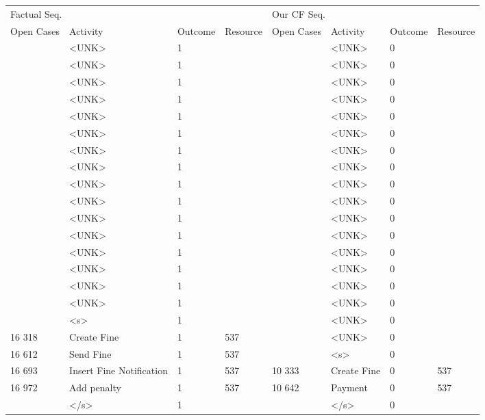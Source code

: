 \begin{tabular}{llllllll}
\toprule
\multicolumn{4}{l}{Factual Seq.} & \multicolumn{4}{l}{Our CF Seq.} \\
Open Cases & Activity & Outcome & Resource & Open Cases & Activity & Outcome & Resource \\
\midrule
 & <UNK> & 1 &  &  & <UNK> & 0 &  \\
 & <UNK> & 1 &  &  & <UNK> & 0 &  \\
 & <UNK> & 1 &  &  & <UNK> & 0 &  \\
 & <UNK> & 1 &  &  & <UNK> & 0 &  \\
 & <UNK> & 1 &  &  & <UNK> & 0 &  \\
 & <UNK> & 1 &  &  & <UNK> & 0 &  \\
 & <UNK> & 1 &  &  & <UNK> & 0 &  \\
 & <UNK> & 1 &  &  & <UNK> & 0 &  \\
 & <UNK> & 1 &  &  & <UNK> & 0 &  \\
 & <UNK> & 1 &  &  & <UNK> & 0 &  \\
 & <UNK> & 1 &  &  & <UNK> & 0 &  \\
 & <UNK> & 1 &  &  & <UNK> & 0 &  \\
 & <UNK> & 1 &  &  & <UNK> & 0 &  \\
 & <UNK> & 1 &  &  & <UNK> & 0 &  \\
 & <UNK> & 1 &  &  & <UNK> & 0 &  \\
 & <UNK> & 1 &  &  & <UNK> & 0 &  \\
 & <s> & 1 &  &  & <UNK> & 0 &  \\
16 318 & Create Fine & 1 & 537 &  & <UNK> & 0 &  \\
16 612 & Send Fine & 1 & 537 &  & <s> & 0 &  \\
16 693 & Insert Fine Notification & 1 & 537 & 10 333 & Create Fine & 0 & 537 \\
16 972 & Add penalty & 1 & 537 & 10 642 & Payment & 0 & 537 \\
 & </s> & 1 &  &  & </s> & 0 &  \\
\bottomrule
\end{tabular}
